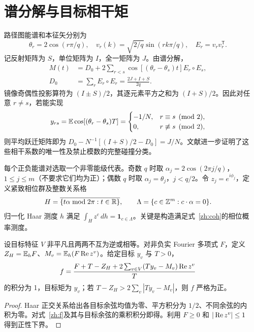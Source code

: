 \documentclass[UTF8,fontset=none,11pt]{ctexart}
\begin{document}
\section{谱分解与目标相干矩}
路径图能谱和本征矢分别为
\begin{equation}\theta_r=2\cos(r\pi/q),\quad v_r(k)=\sqrt{2/q}\sin(rk\pi/q),\quad E_r=v_rv_r^{\mathsf T}.\end{equation}
记反射矩阵为 $S$，单位矩阵为 $I$，全一矩阵为 $J$。由谱分解，
\begin{align}M(t)&=D_0+2\sum_{r<s}\cos[(\theta_r-\theta_s)t]E_r\circ E_s,\\D_0&=\sum_r E_r\circ E_r=\frac{2J+I+S}{2q}.\end{align}
镜像奇偶性投影算符为 $(I\pm S)/2$，其逐元素平方之和为 $(I+S)/2$。因此对任意 $r\ne s$，若能实现
\begin{equation}\label{zh:coh}y_{rs}=\mathbb E\cos[(\theta_r-\theta_s)T]=\begin{cases}-1/N,&r\equiv s\pmod2,\\0,&r\not\equiv s\pmod2,\end{cases}\end{equation}
则平均跃迁矩阵即为 $D_0-N^{-1}[(I+S)/2-D_0]=J/N$。文献\cite{kang}进一步证明了这些相干系数的唯一性及禁止模数的完整碰撞分类。

每个正负能谱对选取一个非零能级代表。奇数 $q$ 时取 $\alpha_j=2\cos(2\pi j/q)$，$1\le j\le m$（不要求它们均为正）；偶数 $q$ 时取 $\alpha_j=\theta_j$，$j<q/2$。令 $z_j=e^{i\phi_j}$，定义紧致相位群及整数关系格
\begin{equation}H=\overline{\{t\alpha\bmod2\pi:t\in\mathbb R\}},\qquad \Lambda=\{c\in\mathbb Z^m:c\cdot\alpha=0\}.\end{equation}
归一化 Haar 测度 $h$ 满足 $\int_H z^c\,dh=\mathbf1_{c\in\Lambda}$。关键是构造满足式~\eqref{zh:coh}的相位概率测度。
\begin{lemma}\label{zh:lemma}
设目标特征 $V$ 非平凡且两两不互为逆或相等。对非负实 Fourier 多项式 $F$，定义 $Z_H=\mathbb E_hF$、$M_v=\mathbb E_h(F\operatorname{Re} z^v)$。给定目标 $y_v$ 与 $T>0$，
\begin{equation}\label{zh:f}f=\frac{F+T-Z_H+2\sum_{v\in V}(Ty_v-M_v)\operatorname{Re} z^v}{T}\end{equation}
的积分为 1，目标矩为 $y_v$；若 $T-Z_H>2\sum_v|Ty_v-M_v|$，则 $f$ 严格为正。
\end{lemma}
\begin{proof}Haar 正交关系给出各目标余弦均值为零、平方积分为 $1/2$、不同余弦的内积为零。对式~\eqref{zh:f}及其与目标余弦的乘积积分即得。利用 $F\ge0$ 和 $|\operatorname{Re} z^v|\le1$ 得到正性下界。\end{proof}
\end{document}
